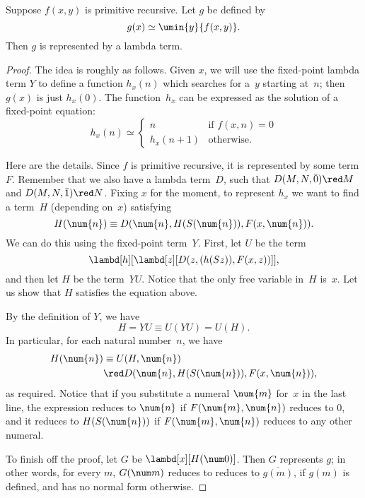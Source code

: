\documentclass[../../../include/open-logic-section]{subfiles}
\begin{document}

\begin{lem}
Suppose $f(x,y)$ is primitive recursive. Let $g$ be defined by
\[
g(x) \simeq \umin{y}{f(x,y)}.
\]
Then $g$ is represented by a lambda term.
\end{lem}

\begin{proof}
The idea is roughly as follows. Given $x$, we will use the fixed-point
lambda term $Y$ to define a function $h_x(n)$ which searches for a~$y$
starting at~$n$; then $g(x)$ is just $h_x(0)$. The function~$h_x$ can
be expressed as the solution of a fixed-point equation:
\[
h_x(n) \simeq
\begin{cases}
n & \text{if $f(x,n) = 0$} \\
h_x(n+1) & \text{otherwise.}
\end{cases}
\]

Here are the details. Since $f$ is primitive recursive, it is
represented by some term $F$. Remember that we also have a lambda
term~$D$, such that $D(M, N, \bar{0}) \red M$ and $D(M, N, \bar{1})
\red N$. Fixing $x$ for the moment, to represent $h_x$ we want to
find a term~$H$ (depending on~$x$) satisfying
\[
H(\num{n}) \equiv D(\num{n}, H(S(\num{n})), F(x, \num{n})).
\]
We can do this using the fixed-point term~$Y$. First, let $U$ be the
term
\[
\lambd[h][\lambd[z][D(z,(h(Sz)),F(x,z))]],
\]
and then let $H$ be the term~$YU$. Notice that the only free variable
in~$H$ is~$x$. Let us show that $H$ satisfies the equation above.

By the definition of $Y$, we have
\[
H = YU \equiv U(YU) = U(H).
\]
In particular, for each natural number~$n$, we have
\begin{align*}
H(\num{n}) & \equiv U(H, \num{n}) \\
& \red D(\num{n}, H(S(\num{n})), F(x, \num{n})),
\end{align*}
as required. Notice that if you substitute a numeral $\num{m}$ for~$x$
in the last line, the expression reduces to $\num{n}$ if $F(\num{m},
\num{n})$ reduces to $\num{0}$, and it reduces to $H(S(\num{n}))$ if
$F(\num{m}, \num{n})$ reduces to any other numeral.

To finish off the proof, let $G$ be $\lambd[x][H(\num 0)]$. Then $G$
represents $g$; in other words, for every $m$, $G(\num m)$ reduces to
reduces to $\overline {g(m)}$, if $g(m)$ is defined, and has no
normal form otherwise.
\end{proof}
\end{document}
